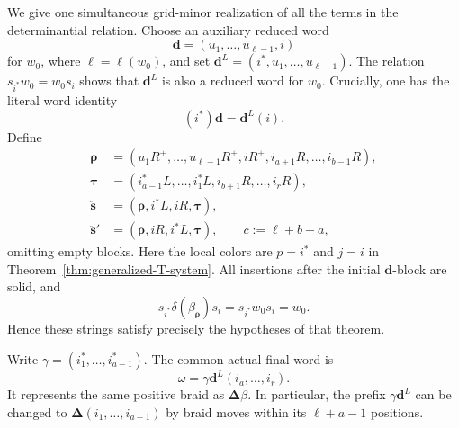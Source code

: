 \documentclass[12pt, reqno]{amsart}
\theoremstyle{plain}
\theoremstyle{definition}
\numberwithin{equation}{section}
\begin{document}
We give one simultaneous grid-minor realization of all the terms
in the determinantial relation. Choose an auxiliary reduced word
\[
 \mathbf d=(u_1,\ldots,u_{\ell-1},i)
\]
for \(w_0\), where \(\ell=\ell(w_0)\), and set
\(\mathbf d^L=(i^*,u_1,\ldots,u_{\ell-1})\).
The relation \(s_{i^*}w_0=w_0s_i\) shows that
\(\mathbf d^L\) is also a reduced word for \(w_0\).
Crucially, one has the literal word identity
\[
 (i^*)\mathbf d=\mathbf d^L(i).
\]
Define
\[
\begin{aligned}
 \boldsymbol\rho
   &=(u_1R^+,\ldots,u_{\ell-1}R^+,iR^+,
        i_{a+1}R,\ldots,i_{b-1}R),\\
 \boldsymbol\tau
   &=(i_{a-1}^*L,\ldots,i_1^*L,
        i_{b+1}R,\ldots,i_rR),\\
 \ddot{\mathbf s}
   &=(\boldsymbol\rho,i^*L,iR,\boldsymbol\tau),\\
 \ddot{\mathbf s}'
   &=(\boldsymbol\rho,iR,i^*L,\boldsymbol\tau),
 \qquad c:=\ell+b-a,
\end{aligned}
\]
omitting empty blocks. Here the local colors are \(p=i^*\)
and \(j=i\) in Theorem~\ref{thm:generalized-T-system}.
All insertions after the initial \(\mathbf d\)-block are solid,
and
\[
 s_{i^*}\delta(\beta_{\boldsymbol\rho})s_i
   =s_{i^*}w_0s_i=w_0.
\]
Hence these strings satisfy precisely the hypotheses of that
theorem.

Write \(\gamma=(i_1^*,\ldots,i_{a-1}^*)\). The common actual
final word is
\[
 \omega=\gamma\mathbf d^L(i_a,\ldots,i_r).
\]
It represents the same positive braid as
\(\boldsymbol\Delta\beta\). In particular, the prefix
\(\gamma\mathbf d^L\) can be changed to
\(\boldsymbol\Delta(i_1,\ldots,i_{a-1})\) by braid moves
within its \(\ell+a-1\) positions.
\end{document}
